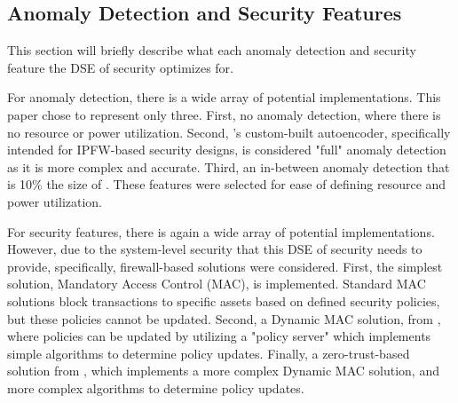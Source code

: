 \subsection{Anomaly Detection and Security Features}

This section will briefly describe what each anomaly detection and security feature the DSE of security optimizes for. 

For anomaly detection, there is a wide array of potential implementations. This paper chose to represent only three. First, no anomaly detection, where there is no resource or power utilization. Second, \cite{butka_anomaly_2025}'s custom-built autoencoder, specifically intended for IPFW-based security designs, is considered "full" anomaly detection as it is more complex and accurate. Third, an in-between anomaly detection that is 10\% the size of \cite{butka_anomaly_2025}. These features were selected for ease of defining resource and power utilization.

For security features, there is again a wide array of potential implementations. However, due to the system-level security that this DSE of security needs to provide, specifically, firewall-based solutions were considered. 
First, the simplest solution, Mandatory Access Control (MAC), is implemented. Standard MAC solutions block transactions to specific assets based on defined security policies, but these policies cannot be updated. Second, a Dynamic MAC solution, from \cite{saha_opentitan_2023}, where policies can be updated by utilizing a "policy server" which implements simple algorithms to determine policy updates. Finally, a zero-trust-based solution from \cite{butka_anomaly_2025}, which implements a more complex Dynamic MAC solution, and more complex algorithms to determine policy updates.







